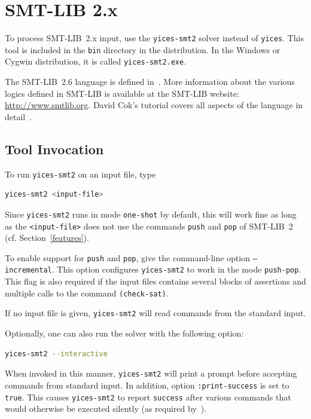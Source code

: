 \documentclass[11pt,twoside,fleqn,openright,titlepage]{cslreport}
\begin{document}
\section{SMT-LIB 2.x}

To process SMT-LIB~2.x input, use the \texttt{yices-smt2} solver
instead of \texttt{yices}. This tool is included in the \texttt{bin}
directory in the distribution. In the Windows or Cygwin distribution,
it is called \texttt{yices-smt2.exe}.

\medskip\noindent The SMT-LIB~2.6 language is defined
in~\cite{SMTLIB26:2017}. More information about the various logics
defined in SMT-LIB is available at the SMT-LIB website:
\url{http://www.smtlib.org}. David Cok's tutorial covers all aspects
of the language in detail~\cite{SMTLIB:tutorial:2013}.


\subsection{Tool Invocation}

To run \texttt{yices-smt2} on an input file, type
\begin{small}
\begin{lstlisting}[language=sh]
   yices-smt2 <input-file>
\end{lstlisting}
\end{small}
Since \texttt{yices-smt2} runs in mode \texttt{one-shot} by default,
this will work fine as long as the \texttt{<input-file>} does not use
the commands \texttt{push} and \texttt{pop} of SMT-LIB~2
(cf. Section~\ref{features}).

\medskip\noindent To enable support for \texttt{push} and
\texttt{pop}, give the command-line option \texttt{--incremental}.
This option configures \texttt{yices-smt2} to work in the mode
\texttt{push-pop}. This flag is also required if the input files
contains several blocks of assertions and multiple calls to the
command \texttt{(check-sat)}.

\medskip\noindent If no input file is given,
\texttt{yices-smt2} will read commands from the standard
input.

\medskip\noindent Optionally, one can also run the solver with the
following option:
\begin{small}
\begin{lstlisting}[language=sh]
   yices-smt2 --interactive
\end{lstlisting}
\end{small}
When invoked in this manner, \texttt{yices-smt2} will print a prompt
before accepting commands from standard input. In addition, option
\texttt{:print-success} is set to \texttt{true}. This causes
\texttt{yices-smt2} to report \texttt{success} after various commands
that would otherwise be executed silently (as required
by~\cite{SMTLIB25:2015}).
\end{document}
